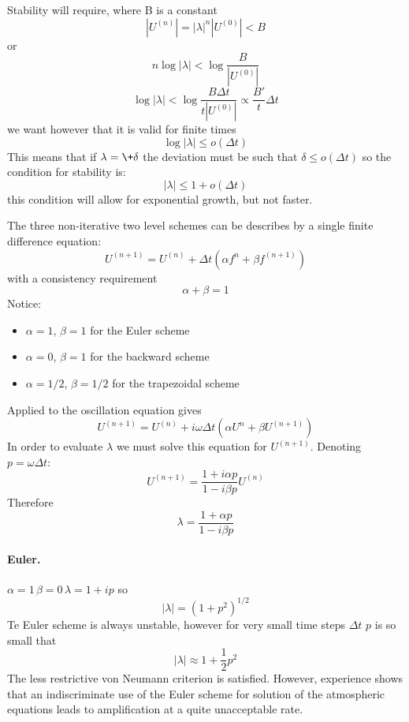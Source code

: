 Stability will require, where B is a constant
\begin{equation}
	|U^{(n)}|=|\lambda|^n|U^{(0)}|<B
\end{equation}
or
\begin{equation}
	n\log|\lambda|<\log\frac{B}{|U^{(0)}|}
\end{equation}
$$\log|\lambda|<\log\frac{B\Delta t}{t|U^{(0)}|}\propto \frac{B'}{t}\Delta t$$
we want however that it is valid for finite times
$$\log|\lambda|\leq o(\Delta t)$$
This means that if $\lambda=\+\delta$ the deviation must be such that $\delta\leq o(\Delta t)$ so the condition for stability is:
\begin{equation}
	|\lambda|\leq 1+o(\Delta t)
\end{equation}
this condition will allow for exponential growth, but not faster.

The three non-iterative two level schemes can be describes by a single finite difference equation:
\begin{equation}\label{3.2.6}
	U^{(n+1)}=U^{(n)}+\Delta t\left(\alpha f^n+\beta f^{(n+1)}\right)
\end{equation}
with a consistency requirement
$$\alpha+\beta=1$$
Notice:
\begin{itemize}
	\item $\alpha=1$, $\beta =1$ for the Euler scheme
	\item $\alpha=0$, $\beta=1$ for the backward scheme
	\item $\alpha=1/2$, $\beta=1/2$ for the trapezoidal scheme
\end{itemize}
Applied to the oscillation equation gives
\begin{equation}
	U^{(n+1)}=U^{(n)}+i\omega\Delta t\left(\alpha U^n+\beta U^{(n+1)}\right)
\end{equation}
In order to evaluate $\lambda$ we must solve this equation for $U^{(n+1)}$. Denoting $p=\omega\Delta t$:
\begin{equation}\label{3.2.9}
	U^{(n+1)}=\frac{1+i\alpha p}{1-i\beta p}U^{(n)}
\end{equation}
Therefore
\begin{equation}\label{3.2.10}
	\lambda=\frac{1+\alpha p}{1-i\beta p}
\end{equation}
\paragraph{Euler.} $\alpha=1 \, \beta=0 \, \lambda=1+ip$
so $$|\lambda|=(1+p^2)^{1/2}$$
Te Euler scheme is always unstable, however for very small time steps $\Delta t$ $p$ is so small that
$$|\lambda|\approx 1+\frac{1}{2}p^2$$
The less restrictive von Neumann criterion is satisfied. However, experience shows that an indiscriminate use of the Euler scheme for solution of the atmospheric equations leads to amplification at a quite unacceptable rate.
